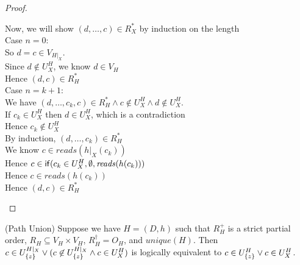 \begin{proof}
\begin{tabbedproof}
\ooo Now, we will show $(d, \ldots, c) \in R^*_X$ by induction on the length \\
\ooo Case $n = 0$: \\
\oooo So $d = c \in V_{H|_X}$. \\
\oooo Since $d \not\in U^H_X$, we know $d \in V_H$ \\
\oooo Hence $(d,c) \in R^*_H$ \\
\ooo Case $n = k+1$: \\
\oooo We have $(d, \ldots, c_k, c) \in R^*_H \land c \not\in U^H_X \land d \not\in U^H_X$. \\
\oooo If $c_k \in U^H_X$ then $d \in U^H_X$, which is a contradiction \\
\oooo Hence $c_k \not\in U^H_X$ \\
\oooo By induction, $(d, \ldots, c_k) \in R^*_H$ \\
\oooo We know $c \in \mathit{reads}(h|_X(c_k))$ \\ 
\oooo Hence $c \in \mathsf{if}({c_k \in U^H_X}, {\emptyset}, {\mathit{reads}(h(c_k))})$ \\
\oooo Hence $c \in \mathit{reads }(h(c_k))$ \\
\oooo Hence $(d, c) \in R^*_H$ \\ 
\end{tabbedproof}
\end{proof}

\begin{lemma}{(Path Union)}
Suppose we have $H = (D,h)$ such that $R^+_H$ is a strict partial
order, $R_H \subseteq V_H \times V_H$, $R^\dagger_H = O_H$, and
$\mathit{unique}(H)$. Then $c \in U^{H|_{X}}_{\{{z}\}} \vee
(c \not\in U^{H|_{X}}_{\{{z}\}} \land c \in U^H_{X})$
is logically equivalent to $c \in U^H_{\{{z}\}} \vee c \in U^H_{X}$.
\end{lemma}


